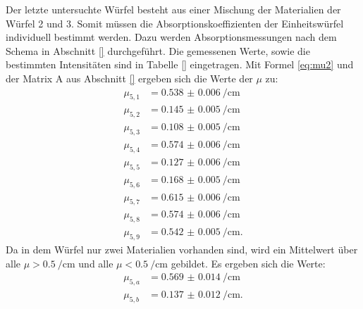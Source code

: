 Der letzte untersuchte Würfel besteht aus einer Mischung der Materialien der Würfel 2 und 3. Somit müssen die Absorptionskoeffizienten der Einheitswürfel individuell bestimmt werden. Dazu werden Absorptionsmessungen nach dem Schema in Abschnitt \ref{} durchgeführt. Die gemessenen Werte, sowie die bestimmten Intensitäten sind in Tabelle \ref{} eingetragen.
Mit Formel \eqref{eq:mu2} und der Matrix A aus Abschnitt \ref{} ergeben sich die Werte der $\mu$ zu:
\begin{align*}
\mu_{5,1} &= \SI{0.538(6)}{\per\centi\metre}\\
\mu_{5,2} &= \SI{0.145(5)}{\per\centi\metre}\\
\mu_{5,3} &= \SI{0.108(5)}{\per\centi\metre}\\
\mu_{5,4} &= \SI{0.574(6)}{\per\centi\metre}\\
\mu_{5,5} &= \SI{0.127(6)}{\per\centi\metre}\\
\mu_{5,6} &= \SI{0.168(5)}{\per\centi\metre}\\
\mu_{5,7} &= \SI{0.615(6)}{\per\centi\metre}\\
\mu_{5,8} &= \SI{0.574(6)}{\per\centi\metre}\\
\mu_{5,9} &= \SI{0.542(5)}{\per\centi\metre}\text{.}
\end{align*}
Da in dem Würfel nur zwei Materialien vorhanden sind, wird ein Mittelwert über alle $\mu >\SI{0.5}{\per\centi\metre}$ und alle $\mu <\SI{0.5}{\per\centi\metre}$ gebildet. Es ergeben sich die Werte:
\begin{align*}
\mu_{5,a} &= \SI{0.569(14)}{\per\centi\metre}\\
\mu_{5,b} &= \SI{0.137(12)}{\per\centi\metre}\text{.}
\end{align*}

